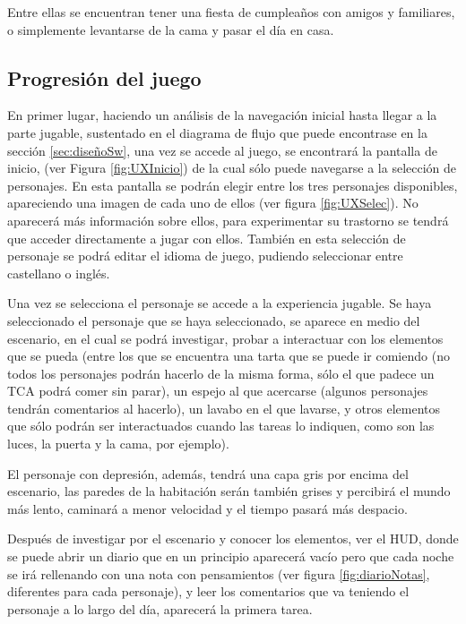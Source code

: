 \documentclass[12pt, a4paper,twoside,titlepage]{book}
\begin{document}
Entre ellas se encuentran tener una fiesta de cumpleaños con amigos y familiares, o simplemente levantarse de la cama y pasar el día en casa. 

\subsection{Progresión del juego}
En primer lugar, haciendo un análisis de la navegación inicial hasta llegar a la parte jugable, sustentado en el diagrama de flujo que puede encontrase en la sección \ref{sec:diseñoSw}, una vez se accede al juego, se encontrará la pantalla de inicio, (ver Figura \ref{fig:UXInicio}) de la cual sólo puede navegarse a la selección de personajes. En esta pantalla se podrán elegir entre los tres personajes disponibles, apareciendo una imagen de cada uno de ellos (ver figura \ref{fig:UXSelec}). No aparecerá más información sobre ellos, para experimentar su trastorno se tendrá que acceder directamente a jugar con ellos. También en esta selección de personaje se podrá editar el idioma de juego, pudiendo seleccionar entre castellano o inglés. 

Una vez se selecciona el personaje se accede a la experiencia jugable. Se haya seleccionado el personaje que se haya seleccionado, se aparece en medio del escenario, en el cual se podrá investigar, probar a interactuar con los elementos que se pueda (entre los que se encuentra una tarta que se puede ir comiendo (no todos los personajes podrán hacerlo de la misma forma, sólo el que padece un TCA podrá comer sin parar), un espejo al que acercarse (algunos personajes tendrán comentarios al hacerlo), un lavabo en el que lavarse, y otros elementos que sólo podrán ser interactuados cuando las tareas lo indiquen, como son las luces, la puerta y la cama, por ejemplo). 

El personaje con depresión, además, tendrá una capa gris por encima del escenario, las paredes de la habitación serán también grises y percibirá el mundo más lento, caminará a menor velocidad y el tiempo pasará más despacio. 

Después de investigar por el escenario y conocer los elementos, ver el HUD, donde se puede abrir un diario que en un principio aparecerá vacío pero que cada noche se irá rellenando con una nota con pensamientos (ver figura \ref{fig:diarioNotas}, diferentes para cada personaje), y leer los comentarios que va teniendo el personaje a lo largo del día, aparecerá la primera tarea. 
\end{document}
